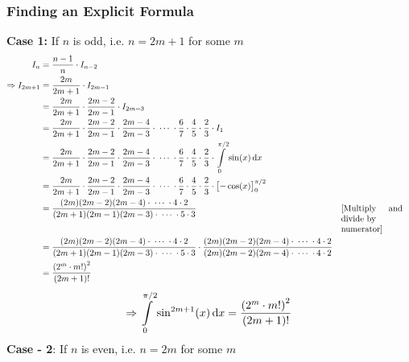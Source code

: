 \documentclass[14]{article}
\theoremstyle{definition}
\theoremstyle{case}
\begin{document}
\subsubsection*{Finding an Explicit Formula}
\textbf{Case 1:} If $n$ is odd, i.e. $n = 2m+1$ for some $m$
\begin{align*}
I_n &= \dfrac{n-1}{n} \cdot I_{n-2}\\
\Rightarrow I_{2m+1} &= \dfrac{2m}{2m+1} \cdot I_{2m-1}\\
&= \dfrac{2m}{2m+1} \cdot \dfrac{2m-2}{2m-1} \cdot I_{2m-3}\\
&= \dfrac{2m}{2m+1} \cdot \dfrac{2m-2}{2m-1} \cdot \dfrac{2m-4}{2m-3} \cdot \; \cdots \; \cdot \dfrac67 \cdot \dfrac{4}{5} \cdot \dfrac23 \cdot I_1\\
&= \dfrac{2m}{2m+1} \cdot \dfrac{2m-2}{2m-1} \cdot \dfrac{2m-4}{2m-3} \cdot \; \cdots \; \cdot \dfrac67 \cdot \dfrac{4}{5} \cdot \dfrac23 \cdot \int\limits_0^{\pi/2} \sin(x) \dif x\\
&= \dfrac{2m}{2m+1} \cdot \dfrac{2m-2}{2m-1} \cdot \dfrac{2m-4}{2m-3} \cdot \; \cdots \; \cdot \dfrac67 \cdot \dfrac{4}{5} \cdot \dfrac23 \cdot \left[ -\cos(x) \right]_0^{\pi/2}\\
&=\dfrac{ (2m)(2m-2)(2m-4)\cdot \; \cdots \; \cdot 4 \cdot 2 }{ (2m+1)(2m-1)(2m-3) \cdot \; \cdots \; \cdot 5 \cdot 3 } && \parbox[t]{2.5cm}{[Multiply and divide by \\numerator]}\\
&=\dfrac{ (2m)(2m-2)(2m-4)\cdot \; \cdots \; \cdot 4 \cdot 2 }{ (2m+1)(2m-1)(2m-3) \cdot \; \cdots \; \cdot 5 \cdot 3 } \cdot \dfrac{(2m)(2m-2)(2m-4)\cdot \; \cdots \; \cdot 4 \cdot 2}{(2m)(2m-2)(2m-4)\cdot \; \cdots \; \cdot 4 \cdot 2}\\
&= \dfrac{\left(2^m \cdot m!\right)^2}{(2m+1)!}
\end{align*}
\[\Rightarrow \int\limits_0^{\pi/2} \sin^{2m+1}(x) \dif x =\dfrac{\left(2^m \cdot m!\right)^2}{(2m+1)!} \]
\textbf{Case - 2}: If $n$ is even, i.e. $n = 2m$ for some $m$
\end{document}

